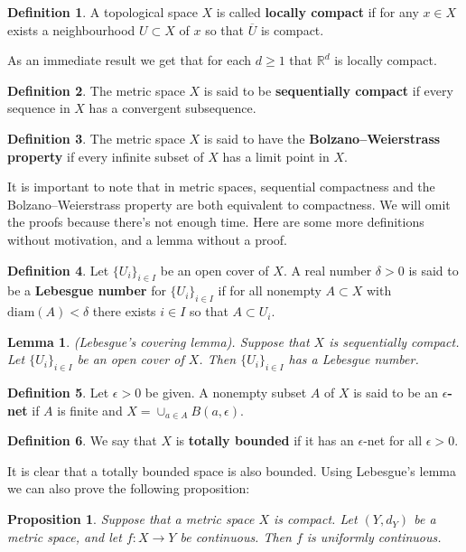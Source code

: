 \documentclass[11pt,a4paper]{article}
\theoremstyle{definition}
\newtheorem{definition}{Definition}[section]
\theoremstyle{plain}
\newtheorem{proposition}[theorem]{Proposition}
\newtheorem{lemma}[theorem]{Lemma}
\newcommand{\R}{\mathbb{R}}
\begin{document}
	\begin{definition}
		A topological space $X$ is called \textbf{locally compact} if for
		any $x \in X$ exists a neighbourhood $U \subset X$ of $x$ so that
		$\overline{U}$ is compact.
	\end{definition}
	As an immediate result we get that for each $d \geq 1$ that $\R^d$
	is locally compact.
	\begin{definition}
		The metric space $X$ is said to be \textbf{sequentially compact} 
		if every sequence in $X$ has a convergent subsequence.
	\end{definition}
	\begin{definition}
		The metric space $X$ is said to have the 
		\textbf{Bolzano–Weierstrass property} if every infinite subset of 
		$X$ has a limit point in $X$.
	\end{definition}
	It is important to note that in metric spaces, sequential compactness and 
	the Bolzano–Weierstrass property are both
	equivalent to compactness. We will omit the proofs because there's not
	enough time. Here are some more definitions without
	motivation, and a lemma without a proof.
	\begin{definition}
		Let $\{U_i\}_{i \in I}$ be an open cover of $X$. A real number 
		$\delta > 0$ is said to be a \textbf{Lebesgue number} 
		for $\{U_i\}_{i \in I}$
		if for all nonempty $A \subset X$ with $\text{diam}(A) < \delta$
		there exists $i \in I$ so that $A \subset U_i$.
	\end{definition}
	\begin{lemma}
		(Lebesgue’s covering lemma). Suppose that $X$ is sequentially 
		compact. Let $\{U_i\}_{i \in I}$ be an open cover of $X$. 
		Then $\{U_i\}_{i \in I}$ has a Lebesgue number.
	\end{lemma}
	\begin{definition}
		Let $\epsilon > 0$ be given. A nonempty subset $A$ of $X$ is 
		said to be an \textbf{$\epsilon$-net} if $A$ is finite and 
		$X = \cup_{a \in A}{B(a, \epsilon)}$.
	\end{definition}
	\begin{definition}
		We say that $X$ is \textbf{totally bounded} if it has an 
		$\epsilon$-net for all $\epsilon > 0$.
	\end{definition}
	It is clear that a totally bounded space is also bounded. 
	Using Lebesgue's lemma we can also prove the following proposition:
	\begin{proposition}
		Suppose that a metric space $X$ is compact. Let $(Y, d_Y)$ be a 
		metric space, and let $f \colon X \to Y$ be continuous. Then $f$ is 
		uniformly continuous.	
	\end{proposition}
\end{document}
